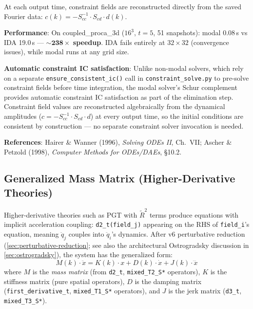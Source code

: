 At each output time, constraint fields are reconstructed directly from the saved Fourier data: $c(k) = -S_{cc}^{-1} \cdot S_{cd} \cdot d(k)$.

\textbf{Performance}: On coupled\_proca\_3d ($16^3$, $t=5$, 51 snapshots): modal 0.08\,s vs IDA 19.0\,s --- $\mathbf{{\sim}238\times}$ \textbf{speedup}. IDA fails entirely at $32\times 32$ (convergence issues), while modal runs at any grid size.

\textbf{Automatic constraint IC satisfaction}: Unlike non-modal solvers, which rely on a separate \texttt{ensure\_consistent\_ic()} call in \texttt{constraint\_solve.py} to pre-solve constraint fields before time integration, the modal solver's Schur complement provides automatic constraint IC satisfaction as part of the elimination step. Constraint field values are reconstructed algebraically from the dynamical amplitudes ($c = -S_{cc}^{-1} \cdot S_{cd} \cdot d$) at every output time, so the initial conditions are consistent by construction --- no separate constraint solver invocation is needed.

\textbf{References}: Hairer \& Wanner (1996), \emph{Solving ODEs II}, Ch.\ VII; Ascher \& Petzold (1998), \emph{Computer Methods for ODEs/DAEs}, \S10.2.

\subsection{Generalized Mass Matrix (Higher-Derivative Theories)}
\label{sec:modal-mass-matrix}

Higher-derivative theories such as PGT with $\tilde{R}^2$ terms produce equations with implicit acceleration coupling: \texttt{d2\_t(field\_j)} appearing on the RHS of \texttt{field\_i}'s equation, meaning $\ddot{q}_j$ couples into $\ddot{q}_i$'s dynamics. After v6 perturbative reduction (\cref{sec:perturbative-reduction}; see also the architectural Ostrogradsky discussion in \cref{sec:ostrogradsky}), the system has the generalized form:
\begin{equation}
  M(k) \cdot \ddot{x} = K(k) \cdot x + D(k) \cdot \dot{x} + J(k) \cdot \dddot{x}
  \label{eq:generalized-mass}
\end{equation}
where $M$ is the \emph{mass matrix} (from \texttt{d2\_t}, \texttt{mixed\_T2\_S*} operators), $K$ is the stiffness matrix (pure spatial operators), $D$ is the damping matrix (\texttt{first\_derivative\_t}, \texttt{mixed\_T1\_S*} operators), and $J$ is the jerk matrix (\texttt{d3\_t}, \texttt{mixed\_T3\_S*}).

